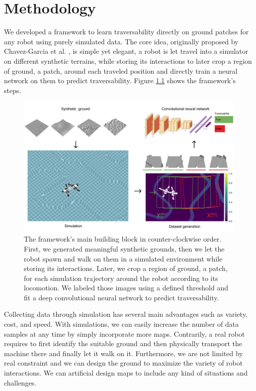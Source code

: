 \documentclass[../document.tex]{subfiles}
\begin{document}
\chapter{Methodology}
We developed a framework to learn traversability directly on ground patches for any robot using purely simulated data. The core idea, originally proposed by Chavez-Garcia et al. \cite{omar2018traversability}, is simple yet elegant, a robot is let travel into a simulator on different synthetic terrains, while storing its interactions to later crop a region of ground, a patch, around each traveled position and directly train a neural network on them to predict traversability. Figure \ref{fig : pipeline} shows the framework's steps.

\begin{figure}[H]
    \centering
        \includegraphics[width=\textwidth]{../img/method.png}
    \caption{The framework's main building block in counter-clockwise order. First, we generated meaningful synthetic grounds, then we let the robot spawn and walk on them in a simulated environment while storing its interactions. Later, we crop a region of ground, a patch, for each simulation trajectory around the robot according to its locomotion. We labeled those images using a defined threshold and fit a deep convolutional neural network to predict traversability. }
    \label{fig : pipeline}
    \end{figure}
Collecting data through simulation has several main advantages such as variety, cost, and speed. With simulations, we can easily increase the number of data samples at any time by simply incorporate more maps. Contrarily, a real robot requires to first identify the suitable ground and then physically transport the machine there and finally let it walk on it.
Furthermore, we are not limited by real constraint and we can design the ground to maximize the variety of robot interactions. We can artificial design maps to include any kind of situations and challenges.
\end{document}
